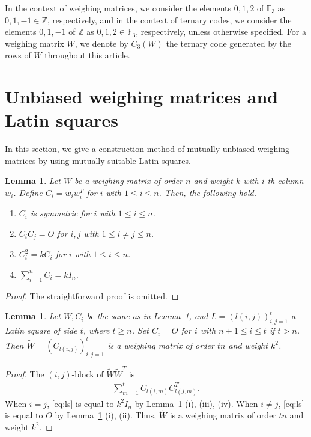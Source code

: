 \documentclass[12pt]{article}
\newtheorem{lem}[thm]{Lemma}
\theoremstyle{remark}
\newcommand{\FF}{\mathbb{F}}
\newcommand{\ZZ}{\mathbb{Z}}
\begin{document}
In the context of weighing matrices, we consider the elements $0,1,2$ of $\FF_3$ as 
$0,1,-1 \in \ZZ$, respectively, and
in the context of ternary codes, we consider the elements $0,1,-1$ of $\ZZ$ as 
$0,1,2 \in \FF_3$, respectively, unless otherwise specified.
For a weighing matrix $W$,
we denote by $C_3(W)$ the ternary code generated by the rows of $W$ throughout this article.


\section{Unbiased weighing matrices and Latin squares}
\label{Sec:Latin}

In this section, we give a construction method of mutually unbiased weighing matrices
by using mutually suitable Latin squares.



\begin{lem}\label{lem:ah}
Let $W$ be a weighing matrix of order $n$ and weight $k$ with $i$-th column $w_i$. 
Define $C_i=w_i w_i^T$ for $i$ with $1\leq i\leq n$. 
Then, the following hold. 
\begin{enumerate}
\item $C_i$ is symmetric  for $i$ with $1\leq i\leq n$. 
\item $C_i C_j=O$ for $i,j$ with $1\leq i\neq j\leq n$.
\item $C_i^2=k C_i$ for $i$ with $1\leq i\leq n$. 
\item $\sum_{i=1}^n C_i=k I_n$. 
\end{enumerate} 
\end{lem}
\begin{proof}
The straightforward proof is omitted.
\end{proof}

\begin{lem}\label{lem:ls}
Let $W,C_i$ be the same as in Lemma~\ref{lem:ah}, and $L=(l(i,j))_{i,j=1}^t$ a Latin square of side $t$, where $t \ge n$. 
Set $C_i=O$ for $i$ with $n+1 \le i \le t$ if $t>n$. 
Then $\widetilde{W}=(C_{l(i,j)})_{i,j=1}^t$ is a weighing matrix of order $tn$ and weight $k^2$.
\end{lem}
\begin{proof}
The $(i,j)$-block of $\widetilde{W}\widetilde{W}^T$ is
\begin{align}\label{eq:ls}
\sum_{m=1}^t C_{l(i,m)}C^T_{l(j,m)}. 
\end{align}
When $i=j$, \eqref{eq:ls} is equal to $k^2 I_{n}$ by Lemma~\ref{lem:ah} (i), (iii), (iv). 
When $i\neq j$, \eqref{eq:ls} is equal to $O$ by Lemma~\ref{lem:ah} (i), (ii). 
Thus, $\widetilde{W}$ is a weighing matrix of order $tn$ and weight $k^2$. 
\end{proof}
\end{document}
